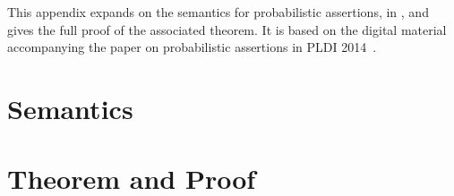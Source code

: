 This appendix expands on the semantics for probabilistic assertions, in
, and gives the full proof of the associated theorem.
It is based on the digital material accompanying the paper on probabilistic
assertions in PLDI 2014~\cite{passert-tr}.

\section{Semantics}


\section{Theorem and Proof}

